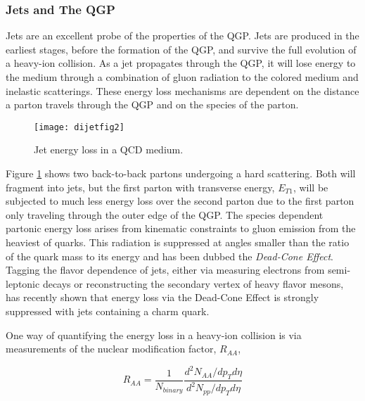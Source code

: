
\subsubsection{Jets and The QGP}

Jets are an excellent probe of the properties of the QGP.  Jets are produced in the earliest stages, before the formation of the QGP, and survive the full evolution of a heavy-ion collision.  As a jet propagates through the QGP, it will lose energy to the medium through a combination of gluon radiation to the colored medium and inelastic scatterings.  These energy loss mechanisms are dependent on the distance a parton travels through the QGP and on the species of the parton.  


\begin{figure}[h]
\texttt{[image: dijetfig2]}
\centering
\caption{Jet energy loss in a QCD medium\cite{Mohanty:2013yca}.}
\label{fig:JetEloss}
\end{figure}

Figure \ref{fig:JetEloss} shows two back-to-back partons undergoing a hard scattering.  Both will fragment into jets, but the first parton with transverse energy, $E_{T1}$, will be subjected to much less energy loss over the second parton due to the first parton only traveling through the outer edge of the QGP.  The species dependent partonic energy loss arises from kinematic constraints to gluon emission from the heaviest of quarks.  This radiation is suppressed at angles smaller than the ratio of the quark mass to its energy and has been dubbed the \textit{Dead-Cone Effect}\cite{Thomas:2004ie}.  Tagging the flavor dependence of jets, either via measuring electrons from semi-leptonic decays or reconstructing the secondary vertex of heavy flavor mesons, has recently shown that energy loss via the Dead-Cone Effect is strongly suppressed with jets containing a charm quark\cite{CAO2018255}.

One way of quantifying the energy loss in a heavy-ion collision is via measurements of the nuclear modification factor, $R_{AA}$,


\begin{equation}
R_{AA} = \frac{1}{N_{binary}} \frac{d^{2}N_{AA}/dp_{T}d\eta}{d^{2}N_{pp}/dp_{T}d\eta}
\label{eq:RAA}
\end{equation}

